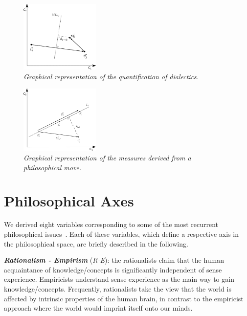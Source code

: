 \documentclass[%
 aip,
 jmp,%
 amsmath,amssymb,
 reprint,%
]{revtex4-1}
\begin{document}
\begin{figure}
        \begin{center}
                \includegraphics[width=0.35\textwidth]{dialetica_.eps}
        \end{center}
        \caption{\it Graphical representation of the quantification of dialectics.}
        \label{fig.1}
\end{figure}


\begin{figure}
        \begin{center}
                \includegraphics[width=0.35\textwidth]{phil-space-desc_}
        \end{center}
        \caption{\it Graphical representation of the measures derived from a \emph{philosophical move}.}
        \label{fig.1}
\end{figure}


\section{Philosophical Axes}
We derived eight variables corresponding to some of the most recurrent
philosophical issues~\cite{Russel,Papineau,Deleuze2}.  Each of
these variables, which define a respective axis in the philosophical
space, are briefly described in the following.

{\bf \em{ Rationalism - Empirism}} (\emph{R-E}): the rationalists
claim that the human acquaintance of knowledge/concepts is
significantly independent of sense experience. Empiricists understand
sense experience as the main way to gain knowledge/concepts.
Frequently, rationalists take the view that the world is affected by
intrinsic properties of the human brain, in contrast to the empiricist
approach where the world would imprint itself onto our minds.
\end{document}
